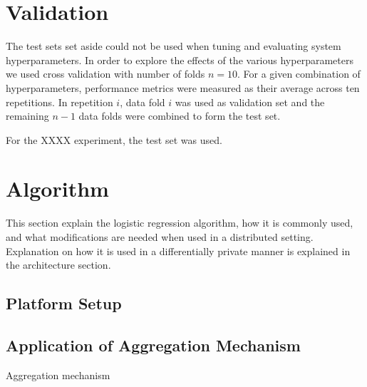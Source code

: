 
\section{Validation}

The test sets set aside could not be used when tuning and evaluating system hyperparameters. In order to explore the effects of the various hyperparameters we used cross validation with number of folds $n=10$. For a given combination of hyperparameters, performance metrics were measured as their average across ten repetitions. In repetition $i$, data fold $i$ was used as validation set and the remaining $n-1$ data folds were combined to form the test set.

For the XXXX experiment, the test set was used.

\section{Algorithm}

This section explain the logistic regression algorithm, how it is commonly used, and what modifications are needed when used in a distributed setting. Explanation on how it is used in a differentially private manner is explained in the architecture section. 

\subsection{Platform Setup}

\subsection{Application of Aggregation Mechanism}

\begin{algorithm}[H]
\caption{Aggregation mechanism}
\end{algorithm}

